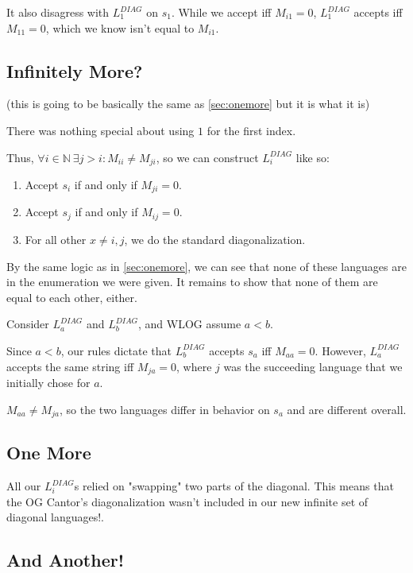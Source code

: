 \documentclass[12pt]{article}
\newcommand{\N}{\mathbb{N}}
\begin{document}
It also disagress with $L_1^{DIAG}$ on $s_1$.
While we accept iff $M_{i1}=0$, $L_1^{DIAG}$ accepts iff $M_{11}=0$,
which we know isn't equal to $M_{i1}$.

\pagebreak

\subsection{Infinitely More?}\label{sec:infmore}

(this is going to be basically the same as \ref{sec:onemore} but it is what it is)

There was nothing special about using $1$ for the first index.

Thus, $\forall i \in \N\ \exists j > i: M_{ii} \ne M_{ji}$, so we can construct $L_i^{DIAG}$ like so:
\begin{enumerate}[nolistsep]
    \item Accept $s_i$ if and only if $M_{ji}=0$.
    \item Accept $s_j$ if and only if $M_{ij}=0$.
    \item For all other $x \ne i, j$, we do the standard diagonalization.
\end{enumerate}

By the same logic as in \ref{sec:onemore}, we can see that none
of these languages are in the enumeration we were given.
It remains to show that none of them are equal to each other, either.

Consider $L_a^{DIAG}$ and $L_b^{DIAG}$, and WLOG assume $a < b$.

Since $a < b$, our rules dictate that $L_b^{DIAG}$ accepts $s_a$ iff $M_{aa}=0$.
However, $L_a^{DIAG}$ accepts the same string iff $M_{ja}=0$,
where $j$ was the succeeding language that we initially chose for $a$.

$M_{aa} \ne M_{ja}$, so the two languages differ in behavior on $s_a$ and are different overall.

\subsection{One More}

All our $L_i^{DIAG}$s relied on "swapping" two parts of the diagonal.
This means that the OG Cantor's diagonalization wasn't included in our
new infinite set of diagonal languages!.

\subsection{And Another!}
\end{document}
